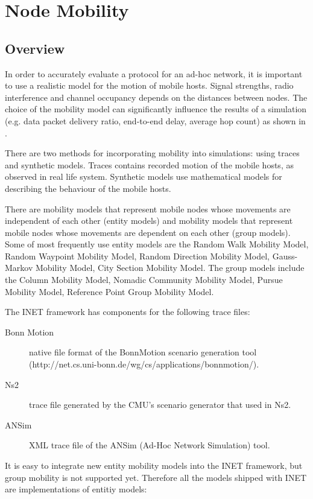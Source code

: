 \chapter{Node Mobility}
\label{cha:mobility}


\section{Overview}

In order to accurately evaluate a protocol for an ad-hoc network,
it is important to use a realistic model for the motion of mobile
hosts. Signal strengths, radio interference and channel occupancy
depends on the distances between nodes. The choice of the mobility
model can significantly influence the results of a simulation
(e.g. data packet delivery ratio, end-to-end delay, average hop count)
as shown in \cite{Camp02asurvey}.

There are two methods for incorporating mobility into simulations:
using traces and synthetic models. Traces contains recorded motion
of the mobile hosts, as observed in real life system. Synthetic models
use mathematical models for describing the behaviour of the mobile hosts.

There are mobility models that represent mobile nodes whose movements 
are independent of each other (entity models) and mobility models
that represent mobile nodes whose movements are dependent on each other
(group models). Some of most frequently use entity models are the
Random Walk Mobility Model, Random Waypoint Mobility Model, Random
Direction Mobility Model, Gauss-Markov Mobility Model, City Section
Mobility Model. The group models include the Column Mobility Model,
Nomadic Community Mobility Model, Pursue Mobility Model,
Reference Point Group Mobility Model.

The INET framework has components for the following trace files:

\begin{description}
\item[Bonn Motion] native file format of the BonnMotion scenario generation
                   tool (http://net.cs.uni-bonn.de/wg/cs/applications/bonnmotion/).
\item[Ns2] trace file generated by the CMU's scenario generator that used in Ns2.
\item[ANSim] XML trace file of the ANSim (Ad-Hoc Network Simulation) tool.
\end{description}

It is easy to integrate new entity mobility models into the INET framework,
but group mobility is not supported yet. Therefore all the models
shipped with INET are implementations of entitiy models:

